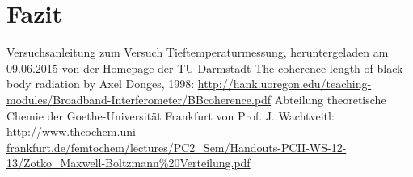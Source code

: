 \documentclass[bigchapter,colorback,accentcolor=tud4b,linedtoc,11pt]{tudreport}
\begin{document}
\chapter{Fazit}

\cleardoublepage{}
\newpage
\begin{thebibliography}{100}
   Versuchsanleitung zum Versuch Tieftemperaturmessung, heruntergeladen am 09.06.2015 von der Homepage der TU Darmstadt
   The coherence length of black-body
radiation by Axel Donges, 1998: \url{http://hank.uoregon.edu/teaching-modules/Broadband-Interferometer/BBcoherence.pdf}
   Abteilung theoretische Chemie der Goethe-Universität
    Frankfurt von Prof. J. Wachtveitl: \url{http://www.theochem.uni-frankfurt.de/femtochem/lectures/PC2_Sem/Handouts-PCII-WS-12-13/Zotko_Maxwell-Boltzmann%20Verteilung.pdf}
\end{thebibliography}
\end{document}
